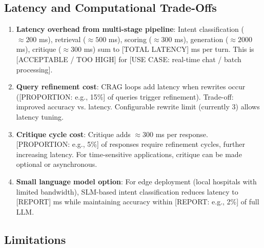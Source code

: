 \documentclass[11pt,a4paper]{article}
\begin{document}
\subsection{Latency and Computational Trade-Offs}
\label{sec:discussion-tradeoffs}

\begin{enumerate}
    \item \textbf{Latency overhead from multi-stage pipeline}: Intent classification ($\approx 200$ ms), retrieval ($\approx 500$ ms), scoring ($\approx 300$ ms), generation ($\approx 2000$ ms), critique ($\approx 300$ ms) sum to [TOTAL LATENCY] ms per turn. This is [ACCEPTABLE / TOO HIGH] for [USE CASE: real-time chat / batch processing].
    
    \item \textbf{Query refinement cost}: CRAG loops add latency when rewrites occur ([PROPORTION: e.g., 15\%] of queries trigger refinement). Trade-off: improved accuracy vs. latency. Configurable rewrite limit (currently 3) allows latency tuning.
    
    \item \textbf{Critique cycle cost}: Critique adds $\approx 300$ ms per response. [PROPORTION: e.g., 5\%] of responses require refinement cycles, further increasing latency. For time-sensitive applications, critique can be made optional or asynchronous.
    
    \item \textbf{Small language model option}: For edge deployment (local hospitals with limited bandwidth), SLM-based intent classification reduces latency to [REPORT] ms while maintaining accuracy within [REPORT: e.g., 2\%] of full LLM.
\end{enumerate}

\subsection{Limitations}
\label{sec:limitations}
\end{document}
